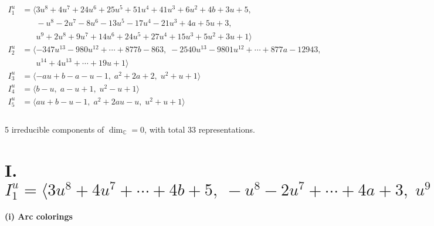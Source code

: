 \documentclass[1p]{elsarticle_modified}
\theoremstyle{definition}
\begin{document}
\begin{align*}
I^u_{1}&=\langle 
3 u^8+4 u^7+24 u^6+25 u^5+51 u^4+41 u^3+6 u^2+4 b+3 u+5,\\
\phantom{I^u_{1}}&\phantom{= \langle  }- u^8-2 u^7-8 u^6-13 u^5-17 u^4-21 u^3+4 a+5 u+3,\\
\phantom{I^u_{1}}&\phantom{= \langle  }u^9+2 u^8+9 u^7+14 u^6+24 u^5+27 u^4+15 u^3+5 u^2+3 u+1\rangle \\
I^u_{2}&=\langle 
-347 u^{13}-980 u^{12}+\cdots+877 b-863,\;-2540 u^{13}-9801 u^{12}+\cdots+877 a-12943,\\
\phantom{I^u_{2}}&\phantom{= \langle  }u^{14}+4 u^{13}+\cdots+19 u+1\rangle \\
I^u_{3}&=\langle 
- a u+b- a- u-1,\;a^2+2 a+2,\;u^2+u+1\rangle \\
I^u_{4}&=\langle 
b- u,\;a- u+1,\;u^2- u+1\rangle \\
I^u_{5}&=\langle 
a u+b- u-1,\;a^2+2 a u- u,\;u^2+u+1\rangle \\
\\
\end{align*}
\raggedright * 5 irreducible components of $\dim_{\mathbb{C}}=0$, with total 33 representations.\\
\newpage
\renewcommand{\arraystretch}{1}
\centering \section*{I. $I^u_{1}= \langle 3 u^8+4 u^7+\cdots+4 b+5,\;- u^8-2 u^7+\cdots+4 a+3,\;u^9+2 u^8+\cdots+3 u+1 \rangle$}
\flushleft \textbf{(i) Arc colorings}\\
\end{document}
